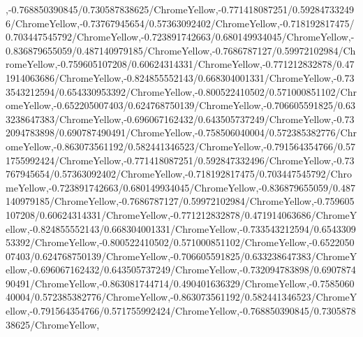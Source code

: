 {\begin{tikzternal}
{,-0.768850390845/0.730587838625/ChromeYellow,-0.771418087251/0.592847332496/ChromeYellow,-0.73767945654/0.57363092402/ChromeYellow,-0.718192817475/0.703447545792/ChromeYellow,-0.723891742663/0.680149934045/ChromeYellow,-0.836879655059/0.487140979185/ChromeYellow,-0.7686787127/0.59972102984/ChromeYellow,-0.759605107208/0.60624314331/ChromeYellow,-0.771212832878/0.471914063686/ChromeYellow,-0.824855552143/0.668304001331/ChromeYellow,-0.733543212594/0.654330953392/ChromeYellow,-0.800522410502/0.571000851102/ChromeYellow,-0.652205007403/0.624768750139/ChromeYellow,-0.706605591825/0.633238647383/ChromeYellow,-0.696067162432/0.643505737249/ChromeYellow,-0.732094783898/0.690787490491/ChromeYellow,-0.758506040004/0.572385382776/ChromeYellow,-0.863073561192/0.582441346523/ChromeYellow,-0.791564354766/0.571755992424/ChromeYellow,-0.771418087251/0.592847332496/ChromeYellow,-0.73767945654/0.57363092402/ChromeYellow,-0.718192817475/0.703447545792/ChromeYellow,-0.723891742663/0.680149934045/ChromeYellow,-0.836879655059/0.487140979185/ChromeYellow,-0.7686787127/0.59972102984/ChromeYellow,-0.759605107208/0.60624314331/ChromeYellow,-0.771212832878/0.471914063686/ChromeYellow,-0.824855552143/0.668304001331/ChromeYellow,-0.733543212594/0.654330953392/ChromeYellow,-0.800522410502/0.571000851102/ChromeYellow,-0.652205007403/0.624768750139/ChromeYellow,-0.706605591825/0.633238647383/ChromeYellow,-0.696067162432/0.643505737249/ChromeYellow,-0.732094783898/0.690787490491/ChromeYellow,-0.863081744714/0.490401636329/ChromeYellow,-0.758506040004/0.572385382776/ChromeYellow,-0.863073561192/0.582441346523/ChromeYellow,-0.791564354766/0.571755992424/ChromeYellow,-0.768850390845/0.730587838625/ChromeYellow,
}
\end{tikzternal}}
